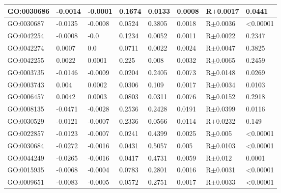 \documentclass[a4,center]{NAR} %
\begin{document}
\begin{table}[h]
{\begin{tabular} {|l|l|l|l|l|l|l|l|}
\hline
GO:0030686&-0.0014&-0.0001&0.1674&0.0133&0.0008&R$\pm$0.0017&0.0441 \\
\hline
GO:0030687&-0.0135&-0.0008&0.0524&0.3805&0.0018&R$\pm$0.0036&\textless 0.00001  \\
\hline
GO:0042254&-0.0008&-0.0&0.1234&0.0052&0.0011&R$\pm$0.0022&0.2347 \\
\hline
GO:0042274&0.0007&0.0&0.0711&0.0022&0.0024&R$\pm$0.0047&0.3825 \\
\hline
GO:0042255&0.0022&0.0001&0.225&0.008&0.0032&R$\pm$0.0065&0.2459\\
\hline
GO:0003735&-0.0146&-0.0009&0.0204&0.2405&0.0073&R$\pm$0.0148&0.0269  \\
\hline
GO:0003743&0.004&0.0002&0.0306&0.109&0.0017&R$\pm$0.0034&0.0103   \\
\hline
GO:0006457&0.0042&0.0003&0.0803&0.0311&0.0076&R$\pm$0.0152&0.2918  \\
\hline
GO:0008135&-0.0471&-0.0028&0.2536&0.2428&0.0191&R$\pm$0.0399&0.0116  \\
\hline
GO:0030529&-0.0121&-0.0007&0.2336&0.0566&0.0114&R$\pm$0.0232&0.149 \\
\hline
GO:0022857&-0.0123&-0.0007&0.0241&0.4399&0.0025&R$\pm$0.005&\textless 0.00001\\
\hline
GO:0030684&-0.0272&-0.0016&0.0431&0.5057&0.005&R$\pm$0.0103&\textless 0.00001\\
\hline
GO:0044249&-0.0265&-0.0016&0.0417&0.4731&0.0059&R$\pm$0.012&0.0001 \\
\hline
GO:0015935&-0.0068& -0.0004& 0.0783 & 0.2801  &0.0016  &R$\pm$0.0031  &     \textless 0.00001 \\
\hline
GO:0009651&-0.0083&-0.0005& 0.0572&0.2751&0.0017&R$\pm$0.0033&\textless 0.00001\\
\hline
\end{tabular}%
}

\end{table}
\end{document}
